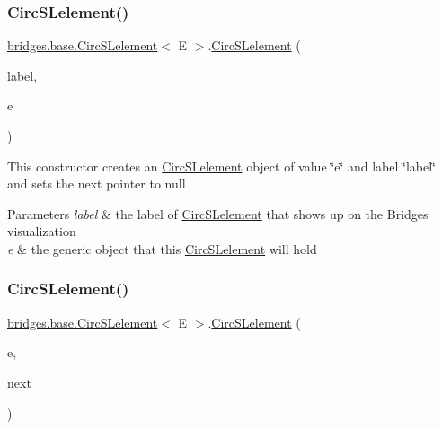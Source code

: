 \subsubsection{\texorpdfstring{Circ\+S\+Lelement()}{CircSLelement()}\hspace{0.1cm}{\footnotesize\ttfamily [2/4]}}
{\footnotesize\ttfamily \hyperlink{classbridges_1_1base_1_1_circ_s_lelement}{bridges.\+base.\+Circ\+S\+Lelement}$<$ E $>$.\hyperlink{classbridges_1_1base_1_1_circ_s_lelement}{Circ\+S\+Lelement} (\begin{DoxyParamCaption}\item[{String}]{label,  }\item[{E}]{e }\end{DoxyParamCaption})}

This constructor creates an \hyperlink{classbridges_1_1base_1_1_circ_s_lelement}{Circ\+S\+Lelement} object of value \char`\"{}e\char`\"{} and label \char`\"{}label\char`\"{} and sets the next pointer to null


\begin{DoxyParams}{Parameters}
{\em label} & the label of \hyperlink{classbridges_1_1base_1_1_circ_s_lelement}{Circ\+S\+Lelement} that shows up on the Bridges visualization \\
\hline
{\em e} & the generic object that this \hyperlink{classbridges_1_1base_1_1_circ_s_lelement}{Circ\+S\+Lelement} will hold \\
\hline
\end{DoxyParams}
\hypertarget{classbridges_1_1base_1_1_circ_s_lelement_ada65c593c8af7e6ed96fcdf12c26824f}{}\label{classbridges_1_1base_1_1_circ_s_lelement_ada65c593c8af7e6ed96fcdf12c26824f} 
\subsubsection{\texorpdfstring{Circ\+S\+Lelement()}{CircSLelement()}\hspace{0.1cm}{\footnotesize\ttfamily [3/4]}}
{\footnotesize\ttfamily \hyperlink{classbridges_1_1base_1_1_circ_s_lelement}{bridges.\+base.\+Circ\+S\+Lelement}$<$ E $>$.\hyperlink{classbridges_1_1base_1_1_circ_s_lelement}{Circ\+S\+Lelement} (\begin{DoxyParamCaption}\item[{E}]{e,  }\item[{\hyperlink{classbridges_1_1base_1_1_circ_s_lelement}{Circ\+S\+Lelement}$<$ E $>$}]{next }\end{DoxyParamCaption})}

